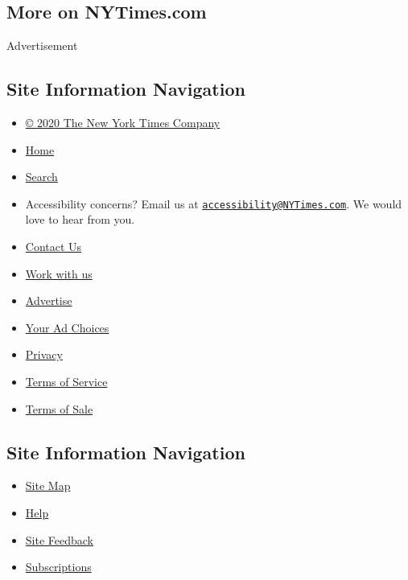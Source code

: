 \hypertarget{more-on-nytimescom}{%
\subsection{More on NYTimes.com}\label{more-on-nytimescom}}

Advertisement

\hypertarget{site-information-navigation}{%
\subsection{Site Information
Navigation}\label{site-information-navigation}}

\begin{itemize}
\tightlist
\item
  \href{https://help.nytimes3xbfgragh.onion/hc/en-us/articles/115014792127-Copyright-notice}{©
  2020 The New York Times Company}
\item
  \href{https://www.nytimes3xbfgragh.onion}{Home}
\item
  \href{https://www.nytimes3xbfgragh.onion/search/}{Search}
\item
  Accessibility concerns? Email us at
  \href{mailto:accessibility@NYTimes.com}{\nolinkurl{accessibility@NYTimes.com}}.
  We would love to hear from you.
\item
  \href{https://help.nytimes3xbfgragh.onion/hc/en-us/articles/115015385887-Contact-Us}{Contact
  Us}
\item
  \href{https://www.nytco.com/careers/}{Work with us}
\item
  \href{https://nytmediakit.com/}{Advertise}
\item
  \href{https://help.nytimes3xbfgragh.onion/hc/en-us/articles/115014892108-Privacy-policy\#pp}{Your
  Ad Choices}
\item
  \href{https://help.nytimes3xbfgragh.onion/hc/en-us/articles/115014892108-Privacy-policy}{Privacy}
\item
  \href{https://help.nytimes3xbfgragh.onion/hc/en-us/articles/115014893428-Terms-of-service}{Terms
  of Service}
\item
  \href{https://help.nytimes3xbfgragh.onion/hc/en-us/articles/115014893968-Terms-of-sale}{Terms
  of Sale}
\end{itemize}

\hypertarget{site-information-navigation-1}{%
\subsection{Site Information
Navigation}\label{site-information-navigation-1}}

\begin{itemize}
\tightlist
\item
  \href{https://spiderbites.nytimes3xbfgragh.onion}{Site Map}
\item
  \href{https://help.nytimes3xbfgragh.onion/hc/en-us}{Help}
\item
  \href{https://help.nytimes3xbfgragh.onion/hc/en-us/articles/115015385887-Contact-Us?redir=myacc}{Site
  Feedback}
\item
  \href{https://www.nytimes3xbfgragh.onion/subscription?campaignId=37WXW}{Subscriptions}
\end{itemize}
